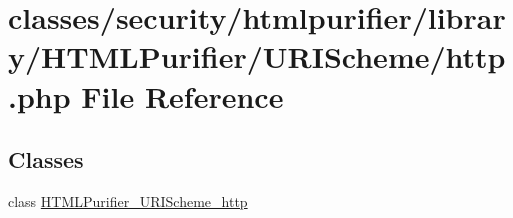 \hypertarget{http_8php}{\section{classes/security/htmlpurifier/library/\+H\+T\+M\+L\+Purifier/\+U\+R\+I\+Scheme/http.php File Reference}
\label{http_8php}
}
\subsection*{Classes}
\begin{DoxyCompactItemize}
\item 
class \hyperlink{classHTMLPurifier__URIScheme__http}{H\+T\+M\+L\+Purifier\+\_\+\+U\+R\+I\+Scheme\+\_\+http}
\end{DoxyCompactItemize}
